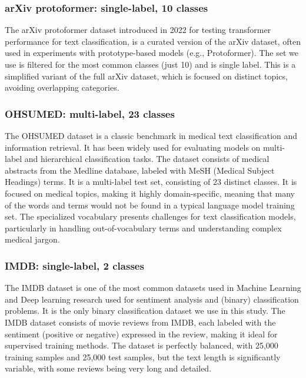 \documentclass[final]{clv2025}
\begin{document}
\subsubsection{arXiv protoformer: single-label, 10 classes}

The arXiv protoformer dataset introduced in 2022 \cite{farhangi} for testing transformer performance for text classification, is a curated version of the arXiv dataset, often used in experiments with prototype-based models (e.g., Protoformer). The set we use is filtered for the most common classes (just 10) and is single label. This is a simplified variant of the full arXiv dataset, which is focused on distinct topics, avoiding overlapping categories.


\subsubsection{OHSUMED: multi-label, 23 classes}

The OHSUMED dataset \cite{sanderson} is a classic benchmark in medical text classification and information retrieval. It has been widely used for evaluating models on multi-label and hierarchical classification tasks. The dataset consists of medical abstracts from the Medline database, labeled with MeSH (Medical Subject Headings) terms. It is a multi-label test set, consisting of 23 distinct classes. It is focused on medical topics, making it highly domain-specific, meaning that many of the words and terms would not be found in a typical language model training set. The specialized vocabulary presents challenges for text classification models, particularly in handling out-of-vocabulary terms and understanding complex medical jargon.


\subsubsection{IMDB: single-label, 2 classes}

The IMDB dataset \cite{maas} is one of the most common datasets used in Machine Learning and Deep learning research used for sentiment analysis and (binary) classification problems. It is the only binary classification dataset we use in this study. The IMDB dataset consists of movie reviews from IMDB, each labeled with the sentiment (positive or negative) expressed in the review, making it ideal for supervised training methods. The dataset is perfectly balanced, with 25,000 training samples and 25,000 test samples, but the text length is significantly variable, with some reviews being very long and detailed. 
\end{document}

